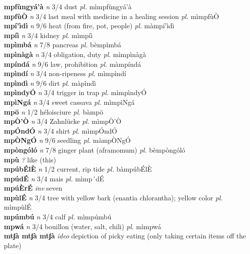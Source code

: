\documentclass{article}
\begin{document}
{\bf mpfùngyá'à}  {\it n} 3/4 dust {\it pl.} mìmpfùngyá'à         \\ 
{\bf mpfùÒ}  {\it n} 3/4 last meal with medicine in a healing session {\it pl.} mìmpfùÒ         \\ 
{\bf mpí'ìdì}  {\it n} 9/6 heat (from fire, pot, people) {\it pl.} màmpí'ìdì         \\ 
{\bf mpíì}  {\it n} 3/4 kidney {\it pl.} mìmpíì         \\ 
{\bf mpìmbá}  {\it n} 7/8 pancreas {\it pl.} bèmpìmbá         \\ 
{\bf mpìnàgà}  {\it n} 3/4 obligation, duty {\it pl.} mìmpìnàgà         \\ 
{\bf mpíndá}  {\it n} 9/6 law, prohibition {\it pl.} màmpíndá         \\ 
{\bf mpìndí}  {\it n} 3/4 non-ripeness {\it pl.} mìmpìndí         \\ 
{\bf mpìndì}  {\it n} 9/6 dirt {\it pl.} màpìndì         \\ 
{\bf mpìndyÓ}  {\it n} 3/4 trigger in trap {\it pl.} mìmpìndyÓ         \\ 
{\bf mpìNgá}  {\it n} 3/4 sweet cassava {\it pl.} mìmpìNgá         \\ 
{\bf mpö}  {\it n} 1/2 héloisciure {\it pl.} bàmpö         \\ 
{\bf mpÒ'Ò}  {\it n} 3/4 Zahnlücke {\it pl.} mìmpÒ'Ò         \\ 
{\bf mpÓndÓ}  {\it n} 3/4 shirt {\it pl.} mìmpÓndÓ         \\ 
{\bf mpÒNgÓ}  {\it n} 9/6 seedling {\it pl.} màmpÒNgÓ         \\ 
{\bf mpòngóló}  {\it n} 7/8 ginger plant (aframomum) {\it pl.} bèmpòngóló         \\ 
{\bf mpù}  {\it ?} like (this)         \\ 
{\bf mpúbÉlÈ}  {\it n} 1/2 current, rip tide {\it pl.} bàmpúbÉlÈ         \\ 
{\bf mpúdÉ}  {\it n} 3/4 mais {\it pl.} mìmp´dÉ         \\ 
{\bf mpúÈrÉ}  {\it inv} seven         \\ 
{\bf mpùlÉ}  {\it n} 3/4 tree with yellow bark (enantia chlorantha); yellow color {\it pl.} mìmpùlÉ         \\ 
{\bf mpúmbú}  {\it n} 3/4 calf {\it pl.} mìmpúmbú         \\ 
{\bf mpwá}  {\it n} 3/4 bouillon (water, salt, chili) {\it pl.} mìmpwá         \\ 
{\bf mtʃà mtʃà mtʃà}  {\it ideo} depiction of picky eating (only taking certain items off the plate)         \\ 
\end{document}
